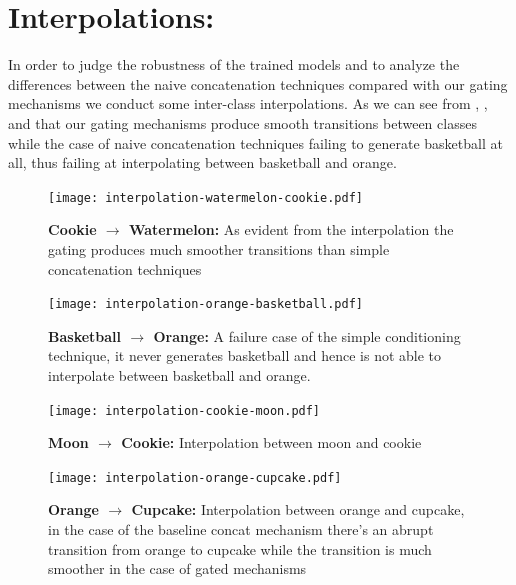 \section{Interpolations:}
In order to judge the robustness of the trained models and to analyze the differences between the naive concatenation techniques compared with our gating mechanisms we conduct some inter-class interpolations. As we can see from , ,  and  that our gating mechanisms produce smooth transitions between classes while the case of naive concatenation techniques failing to generate basketball at all, thus failing at interpolating between basketball and orange.


% 
% 

\begin{figure}[t]
    \centering
    \texttt{[image: interpolation-watermelon-cookie.pdf]}
    \caption{{\bf Cookie $\rightarrow$ Watermelon:} As evident from the interpolation the gating produces much smoother transitions than simple concatenation techniques }
    \label{fig:inter_watermelon_cookie}
    \vspace{-3mm}
\end{figure}


\begin{figure}[t]
    \centering
    \texttt{[image: interpolation-orange-basketball.pdf]}
    \caption{ {\bf Basketball $\rightarrow$ Orange:} A failure case of the simple conditioning technique, it never generates basketball and hence is not able to interpolate between basketball and orange. }
    \label{fig:inter_orange_basketball}
    \vspace{-3mm}
\end{figure}

\begin{figure}[t]
    \centering
    \texttt{[image: interpolation-cookie-moon.pdf]}
    \caption{ {\bf Moon $\rightarrow$ Cookie:} Interpolation between moon and cookie }
    \label{fig:inter_cookie_moon}
    \vspace{-3mm}
\end{figure}

\begin{figure}[t]
    \centering
    \texttt{[image: interpolation-orange-cupcake.pdf]}
    \caption{ {\bf Orange $\rightarrow$ Cupcake:} Interpolation between orange and cupcake, in the case of the baseline concat mechanism there's an abrupt transition from orange to cupcake while the transition is much smoother in the case of gated mechanisms }
    \label{fig:inter_orange_cupcake}
    \vspace{-3mm}
\end{figure}




